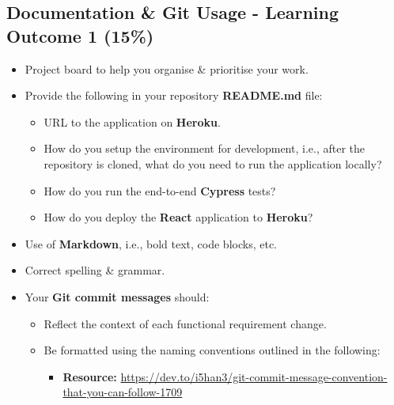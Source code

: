 \documentclass{article}
\begin{document}
\subsection*{Documentation \& Git Usage - Learning Outcome 1 (15\%)}
\begin{itemize}
  \item Project board to help you organise \& prioritise your work.
  \item Provide the following in your repository \textbf{README.md} file:
        \begin{itemize}
          \item URL to the application on \textbf{Heroku}.
          \item How do you setup the environment for development, i.e., after the repository is cloned, what do you need to run the application locally?
          \item How do you run the end-to-end \textbf{Cypress} tests?
          \item How do you deploy the \textbf{React} application to \textbf{Heroku}?
        \end{itemize}
  \item Use of \textbf{Markdown}, i.e., bold text, code blocks, etc.
  \item Correct spelling \& grammar.
  \item Your \textbf{Git commit messages} should:
        \begin{itemize}
          \item Reflect the context of each functional requirement change.
          \item Be formatted using the naming conventions outlined in the following:
                \begin{itemize}
                  \item \textbf{Resource:} \small\href{https://dev.to/i5han3/git-commit-message-convention-that-you-can-follow-1709}{https://dev.to/i5han3/git-commit-message-convention-that-you-can-follow-1709}
                \end{itemize}
        \end{itemize}
\end{itemize}
\end{document}
